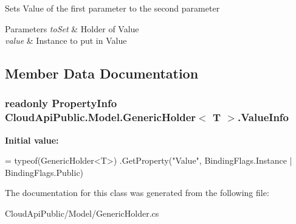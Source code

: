 Sets Value of the first parameter to the second parameter 


\begin{DoxyParams}{Parameters}
{\em to\-Set} & Holder of Value\\
\hline
{\em value} & Instance to put in Value\\
\hline
\end{DoxyParams}


\subsection{Member Data Documentation}
\hypertarget{class_cloud_api_public_1_1_model_1_1_generic_holder_3_01_t_01_4_a265f462840c6ed99fada90f57ab8aac2}{
\subsubsection[{Value\-Info}]{\setlength{\rightskip}{0pt plus 5cm}readonly Property\-Info Cloud\-Api\-Public.\-Model.\-Generic\-Holder$<$ T $>$.Value\-Info\hspace{0.3cm}{\ttfamily [static]}}}\label{class_cloud_api_public_1_1_model_1_1_generic_holder_3_01_t_01_4_a265f462840c6ed99fada90f57ab8aac2}
{\bfseries Initial value\-:}
\begin{DoxyCode}
= typeof(GenericHolder<T>)
            .GetProperty(\textcolor{stringliteral}{"Value"}, BindingFlags.Instance | BindingFlags.Public)
\end{DoxyCode}


The documentation for this class was generated from the following file\-:\begin{DoxyCompactItemize}
\item 
Cloud\-Api\-Public/\-Model/Generic\-Holder.\-cs\end{DoxyCompactItemize}
